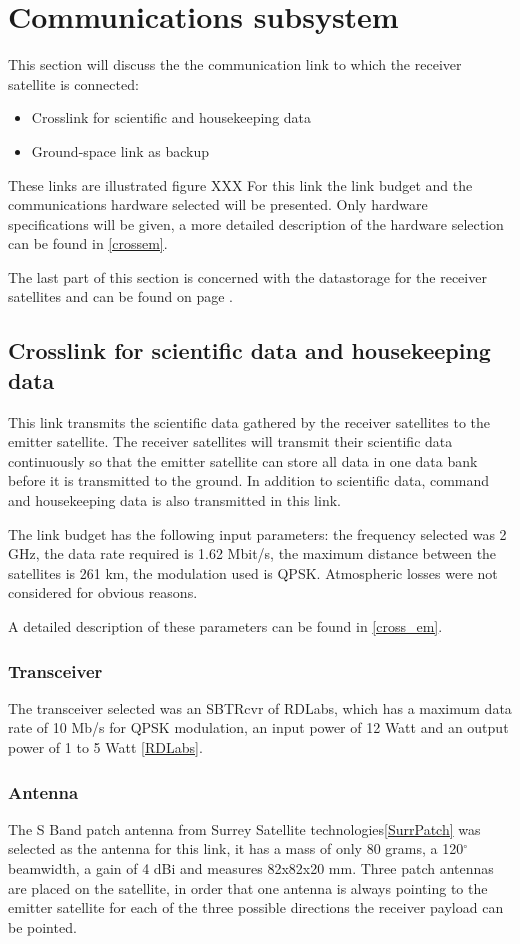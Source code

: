\section{Communications subsystem}
This section will discuss the  the communication link to which the receiver satellite is connected:
\begin{itemize}
\item Crosslink for scientific and housekeeping data
\item Ground-space link as backup
\end{itemize}

These links are illustrated figure XXX
For this link the link budget and the communications hardware selected will be presented. Only hardware specifications will be given, a more detailed description of the hardware selection can be found in \ref{crossem}.

The last part of this section is concerned with the datastorage for the receiver satellites and can be found on page \pageref{DSReciever}.

\subsection{Crosslink for scientific data and housekeeping data}
This link transmits the scientific data gathered by the receiver satellites to the emitter satellite. The receiver satellites will transmit their scientific data continuously so that the emitter satellite can store all data in one data bank before it is transmitted to the ground. In addition to scientific data, command and housekeeping data is also transmitted in this link.

The link budget has the following input parameters: the frequency selected was 2 GHz, the data rate required is 1.62 Mbit/s, the maximum distance between the satellites is 261 km, the modulation used is QPSK. Atmospheric losses were not considered for obvious reasons.

A detailed description of these parameters can be found in \ref{cross_em}.

\subsubsection{Transceiver}
The transceiver selected was an SBTRcvr of RDLabs, which has a maximum data rate of 10 Mb/s for QPSK modulation, an input power of 12 Watt and an output power of 1 to 5 Watt \ref{RDLabs}.

\subsubsection{Antenna}
The S Band patch antenna from Surrey Satellite technologies\ref{SurrPatch} was selected as the antenna for this link, it has a mass of only 80 grams, a 120$^{\circ}$ beamwidth, a gain of 4 dBi and measures 82x82x20 mm. Three patch antennas are placed on the satellite, in order that one antenna is always pointing to the emitter satellite for each of the three possible directions the receiver payload can be pointed.

